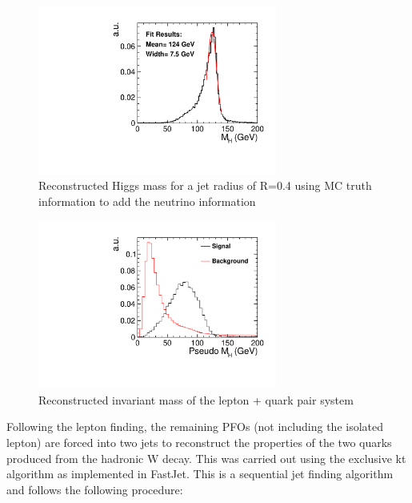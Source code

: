 \begin{figure}
  \centering
  \includegraphics[width=0.7\textwidth,keepaspectratio]{HiggsAnalysis/figures/CheatHiggs04}
  \caption[Reconstructed Higgs Mass For Optimum Jet Radius]{Reconstructed Higgs mass for a jet radius of R=0.4 using MC truth information to add the neutrino information}
  \label{fig:cheatHiggsMass}
\end{figure}

\begin{figure}
  \centering
  \includegraphics[width=0.7\textwidth,keepaspectratio]{HiggsAnalysis/figures/PseudoHiggs.pdf}
  \caption[Reconstructed Higgs Mass]{Reconstructed invariant mass of the lepton + quark pair system}
  \label{fig:pseudoHiggsMass}
\end{figure}


Following the lepton finding, the remaining PFOs (not including the isolated lepton) are forced into two jets to reconstruct the properties of the two quarks produced from the hadronic W decay. This was carried out using the exclusive kt algorithm as implemented in FastJet. This is a sequential jet finding algorithm and follows the following procedure:


